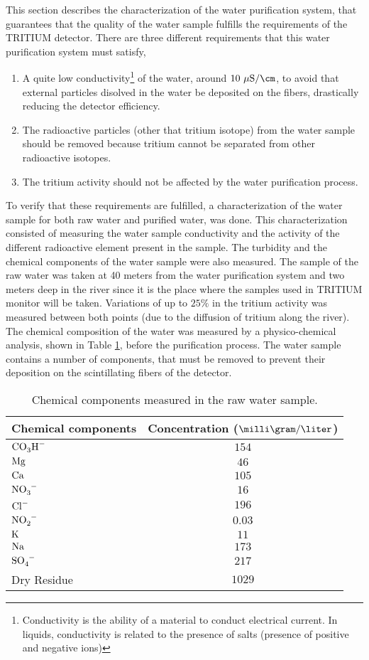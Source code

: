 This section describes the characterization of the water purification system, that guarantees that the quality of the water sample fulfills the requirements of the TRITIUM detector. There are three different requirements that this water purification system must satisfy,

\begin{enumerate}
\item{} A quite low conductivity\footnote{Conductivity is the ability of a material to conduct electrical current. In liquids, conductivity is related to the presence of salts (presence of positive and negative ions)} of the water, around $10~\mu\text{S}/\cm$, to avoid that external particles disolved in the water be deposited on the fibers, drastically reducing the detector efficiency.

\item{} The radioactive particles (other that tritium isotope) from the water sample should be removed because tritium cannot be separated from other radioactive isotopes.

\item{} The tritium activity should not be affected by the water purification process. 

\end{enumerate}

To verify that these requirements are fulfilled, a characterization of the water sample for both raw water and purified water, was done. This characterization consisted of measuring the water sample conductivity and the activity of the different radioactive element present in the sample. The turbidity and the chemical components of the water sample were also measured. The sample of the raw water was taken at 40 meters from the water purification system and two meters deep in the river since it is the place where the samples used in TRITIUM monitor will be taken. Variations of up to $25\%$ in the tritium activity was measured between both points (due to the diffusion of tritium along the river). The chemical composition of the water was measured by a physico-chemical analysis, shown in Table \ref{tab:ChemicalComponentsRawWater}, before the purification process. The water sample contains a number of components, that must be removed to prevent their deposition on the scintillating fibers of the detector.


\begin{table}[htbp]
\centering{}%
\begin{tabular}{lc}
\toprule 
Chemical components & Concentration ($\milli\gram/\liter$) \tabularnewline
\midrule
\midrule 
$\ce{CO_{3}H^-}$ & $154$ \tabularnewline
$\ce{Mg}$ & $46$ \tabularnewline
$\ce{Ca}$ & $105$ \tabularnewline
$\ce{NO_{3}^-}$ & $16$ \tabularnewline
$\ce{Cl^-}$ & $196$ \tabularnewline
$\ce{NO_{2}^-}$ & $0.03$ \tabularnewline
$\ce{K}$ & $11$ \tabularnewline
$\ce{Na}$ & $173$ \tabularnewline
$\ce{SO_{4}^-}$ & $217$ \tabularnewline
Dry Residue & $1029$ \tabularnewline
\bottomrule
\end{tabular}
\caption{Chemical components measured in the raw water sample.}
\label{tab:ChemicalComponentsRawWater}
\end{table}

